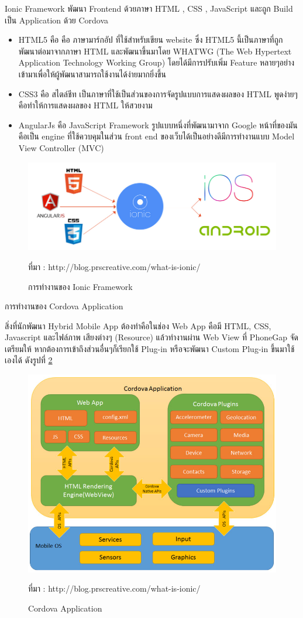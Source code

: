 		Ionic Framework พัฒนา Frontend ด้วยภาษา HTML , CSS , JavaScript และถูก Build เป็น Application ด้วย Cordova
		\begin{itemize}
		\item HTML5  คือ คือ ภาษามาร์กอัป ที่ใช้สำหรับเขียน website ซึ่ง HTML5 นี้เป็นภาษาที่ถูกพัฒนาต่อมาจากภาษา HTML และพัฒนาขึ้นมาโดย WHATWG (The Web Hypertext Application Technology Working Group) โดยได้มีการปรับเพิ่ม Feature หลายๆอย่างเข้ามาเพื่อให้ผู้พัฒนาสามารถใช้งานได้ง่ายมากยิ่งขึ้น
		\item CSS3  คือ สไตล์ชีท เป็นภาษาที่ใช้เป็นส่วนของการจัดรูปแบบการแสดงผลของ HTML พูดง่ายๆ คือทำให้การแสดงผลของ HTML ให้สวยงาม
		\item AngularJs คือ JavaScript Framework  รูปแบบหนึ่งที่พัฒนามาจาก Google หน้าที่ของมันคือเป็น engine ที่ใช้ควบคุมในส่วน front end ของเว็บได้เป็นอย่างดีมีการทำงานแบบ Model View Controller (MVC)
		\end{itemize}
		\begin{figure}[H]
			\centering
			\includegraphics[width=0.8\columnwidth]{Figures/2/ionic1}
			\caption{การทำงานของ Ionic Framework}{ที่มา : http://blog.prscreative.com/what-is-ionic/}
			\label{Fig:ionic}
		\end{figure}

		การทำงานของ Cordova Application


		สิ่งที่นักพัฒนา Hybrid Mobile App ต้องทำคือในช่อง Web App คือมี HTML, CSS, Javascript และไฟล์ภาพ เสียงต่างๆ (Resource) แล้วทำงานผ่าน Web View ที่ PhoneGap จัดเตรียมให้ หากต้องการเข้าถึงส่วนอื่นๆก็เรียกใช้ Plug-in หรือจะพัฒนา Custom Plug-in ขึ้นมาใช้เองได้ ดังรูปที่ \ref{Fig:ionic1}
		\begin{figure}[H]
			\centering
			\includegraphics[width=0.8\columnwidth]{Figures/2/ionic2}
			\caption{Cordova Application}{ที่มา : http://blog.prscreative.com/what-is-ionic/}
			\label{Fig:ionic1}
		\end{figure}

